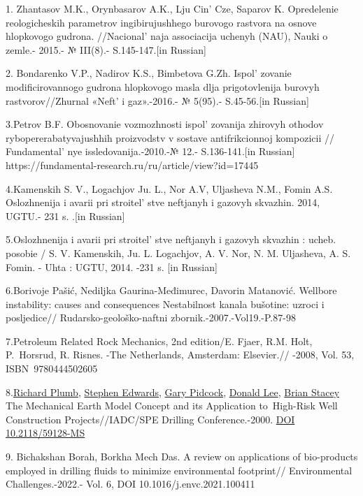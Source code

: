\begin{references}

1. Zhantasov M.K., Orynbasarov A.K., Lju Cin'{} Cze,
Saparov K. Opredelenie reologicheskih parametrov ingibirujushhego
burovogo rastvora na osnove hlopkovogo gudrona.
//Nacional' naja associacija uchenyh (NAU), Nauki o
zemle.- 2015.- № III(8).- S.145-147.{[}in Russian{]}

2. Bondarenko V.P., Nadirov K.S., Bimbetova G.Zh.
Ispol' zovanie modificirovannogo gudrona hlopkovogo masla
dlja prigotovlenija burovyh rastvorov//Zhurnal «Neft'{} i
gaz».-2016.- № 5(95).- S.45-56.{[}in Russian{]}

3.Petrov B.F. Obosnovanie vozmozhnosti ispol' zovanija
zhirovyh othodov rybopererabatyvajushhih proizvodstv v sostave
antifrikcionnoj kompozicii // Fundamental' nye
issledovanija.-2010.-№ 12.- S.136-141.{[}in Russian{]}
https://fundamental-research.ru/ru/article/view?id=17445

4.Kamenskih S. V., Logachjov Ju. L., Nor A.V, Uljasheva N.M., Fomin A.S.
Oslozhnenija i avarii pri stroitel' stve neftjanyh i
gazovyh skvazhin. 2014, UGTU.- 231 s. .{[}in Russian{]}

5.Oslozhnenija i avarii pri stroitel' stve neftjanyh i
gazovyh skvazhin : ucheb. posobie / S. V. Kamenskih, Ju. L. Logachjov,
A. V. Nor, N. M. Uljasheva, A. S. Fomin. - Uhta : UGTU, 2014. -231 s.
{[}in Russian{]}

6.Borivoje Pašić, Nediljka Gaurina-Međimurec, Davorin Matanović.
Wellbore instability: causes and consequences Nestabilnost kanala
bušotine: uzroci i posljedice// Rudarsko-geološko-naftni
zbornik.-2007.-Vol19.-P.87-98

7.Petroleum Related Rock Mechanics, 2nd edition/E. Fjaer, R.M. Holt,
P.~Horsrud, R. Risnes. -The Netherlands, Amsterdam: Elsevier.// -2008,
Vol. 53, ISBN~9780444502605

8.\href{javascript:;}{Richard Plumb}, \href{javascript:;}{Stephen
Edwards}, \href{javascript:;}{Gary Pidcock}, \href{javascript:;}{Donald
Lee}, \href{javascript:;}{Brian Stacey} The Mechanical Earth Model
Concept and its Application to~High-Risk Well Construction
Projects//IADC/SPE Drilling Conference.-2000.
\href{https://doi.org/10.2118/59128-MS}{DOI 10.2118/59128-MS}

9. Bichakshan Borah, Borkha Mech Das. A review on applications of
bio-products employed in drilling fluids to minimize environmental
footprint// Environmental Challenges.-2022.- Vol. 6, DOI
10.1016/j.envc.2021.100411


\end{references}

